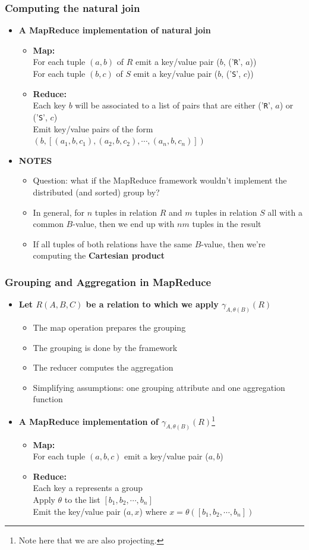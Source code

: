 \documentclass{beamer}
\newcommand{\bi}{\begin{itemize}}
\newcommand{\ei}{\end{itemize}}
\newcommand{\ii}{\item}
\newcommand*{\mygreen}[1]{\textcolor{mygreen}{#1}}
\newcommand*{\myred}[1]{\textcolor{myred}{#1}}
\begin{document}
\begin{frame}
\frametitle{Computing the natural join}

\bi
\ii \textbf{A MapReduce implementation of natural join}
\bi
\ii \mygreen{\textbf{Map:}}\\
For each tuple $(a, b)$ of $R$ emit a key/value pair ($b$, ('\texttt{R}', $a$))\\
For each tuple $(b, c)$ of $S$ emit a key/value pair ($b$, ('\texttt{S}', $c$))
\ii \mygreen{\textbf{Reduce:}}\\
Each key $b$ will be associated to a list of pairs that are either ('\texttt{R}', $a$) or ('\texttt{S}', $c$) \\
Emit key/value pairs of the form $(b,[(a_1, b, c_1), (a_2, b, c_2), \cdots , (a_n, b, c_n)])$ 
\ei
\ei

\bi
\ii \textbf{NOTES}
\bi
\ii \myred{Question:} what if the MapReduce framework wouldn't implement the distributed (and sorted) group by?
\ii In general, for $n$ tuples in relation $R$ and $m$ tuples in relation $S$ all with a common $B$-value, then we end up with $nm$ tuples in the result
\ii If all tuples of both relations have the same $B$-value, then we’re computing the \textbf{Cartesian product}
\ei
\ei

\end{frame}



\begin{frame}
\frametitle{Grouping and Aggregation in MapReduce}

\bi
\ii \textbf{Let $R(A, B, C)$ be a relation to which we apply $\gamma_{A, \theta(B)}(R)$} 
\bi
\ii The map operation prepares the grouping
\ii The grouping is done by the framework
\ii The reducer computes the aggregation
\ii Simplifying assumptions: one grouping attribute and one aggregation function
\ei
\ei

\bi
\ii \textbf{A MapReduce implementation of $\gamma_{A, \theta(B)}(R)$}\footnote{Note here that we are also projecting.}
\bi
\ii \mygreen{\textbf{Map:}}\\
For each tuple $(a, b, c)$ emit a key/value pair ($a, b$) \\
\ii \mygreen{\textbf{Reduce:}}\\
Each key a represents a group\\
Apply $\theta$ to the list $[b_1, b_2, \cdots , b_n]$ \\
Emit the key/value pair ($a, x$) where $x = \theta([b_1, b_2, \cdots , b_n])$
\ei
\ei

\end{frame}
\end{document}
